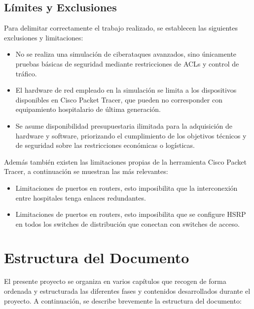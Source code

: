 \subsection{Límites y Exclusiones}
\label{subsec:limites}
Para delimitar correctamente el trabajo realizado, se establecen las siguientes exclusiones y limitaciones:
\begin{itemize}
    \item No se realiza una simulación de ciberataques avanzados, sino únicamente pruebas básicas de seguridad mediante restricciones de \acs{ACL}s y control de tráfico.
    \item El hardware de red empleado en la simulación se limita a los dispositivos disponibles en Cisco Packet Tracer, que pueden no corresponder con equipamiento 
    hospitalario de última generación.
    \item Se asume disponibilidad presupuestaria ilimitada para la adquisición de hardware y software, priorizando el cumplimiento de los objetivos técnicos y de 
    seguridad sobre las restricciones económicas o logísticas.
\end{itemize}
Además también existen las limitaciones propias de la herramienta Cisco Packet Tracer, a continuación se muestran las más relevantes:
\begin{itemize}
    \item Limitaciones de puertos en routers, esto imposibilita que la interconexión entre hospitales tenga enlaces redundantes.
    \item Limitaciones de puertos en routers, esto imposibilita que se configure HSRP en todos los switches de distribución que conectan con switches de acceso.
\end{itemize}

\section{Estructura del Documento}
El presente proyecto se organiza en varios capítulos que recogen de forma ordenada y estructurada las diferentes fases y contenidos desarrollados durante el proyecto. 
A continuación, se describe brevemente la estructura del documento:

